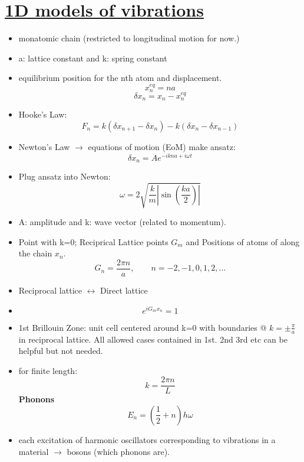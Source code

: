 \section[1D models of vibrations]{\hyperlink{toc}{1D models of vibrations}}

\begin{itemize}
    \item monatomic chain (restricted to longitudinal motion for now.)
    \item a: lattice constant and k: spring constant
    \item equilibrium position for the nth atom and displacement.
    \[x_n^{eq}= na\]
    \[\delta x_n = x_n - x_n^{eq}\]
    \item Hooke's Law:
    \[F_n = k( \delta x_{n+1} - \delta x_n)-k(\delta x_n - \delta x_{n-1})\]
    \item Newton's Law $\rightarrow$ equations of motion (EoM) make ansatz:
    \[\delta x_n = A e^{-ikna + i \omega t} \] 
    \item Plug ansatz into Newton:
    \[ \omega = 2 \sqrt{\frac{k}{m}\left| \sin\left(\frac{ka}{2}\right)\right|} \]
    \item A: amplitude and k: wave vector (related to momentum).
    \item Point with k=0; Reciprical Lattice points $G_m$ and Positions of atoms of along the chain $x_n$.
    \[G_n = \frac{2 \pi n}{a} , \qquad n = -2,-1,0,1,2,...\]
    \item Reciprocal lattice $\leftrightarrow$ Direct lattice
    \item
    \[e^{iG_m x_n} = 1 \]
    \item 1st Brillouin Zone: unit cell centered around k=0 with boundaries @ $k= \pm \frac{\pi}{a}$ in reciprocal lattice. All allowed cases contained in 1st. 2nd 3rd etc can be helpful but not needed.
    \item for finite length: 
    \[k=\frac{2\pi n}{L} \] 
    \textbf{Phonons}
    \[E_n = (\frac{1}{2}+n)h\omega \]
    \item each excitation of harmonic oscillators corresponding to vibrations in a material $\rightarrow$ bosons (which phonons are).
    

\end{itemize}
